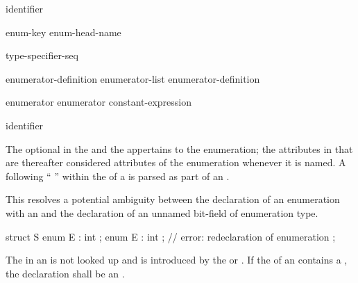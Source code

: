 \begin{bnf}
\br
     identifier
\end{bnf}

\begin{bnf}
\br
    enum-key  enum-head-name  \terminal{;}
\end{bnf}

\begin{bnf}
\br
    \br
     \br
     
\end{bnf}

\begin{bnf}
\br
    \terminal{:} type-specifier-seq
\end{bnf}

\begin{bnf}
\br
    enumerator-definition\br
    enumerator-list \terminal{,} enumerator-definition
\end{bnf}

\begin{bnf}
\br
    enumerator\br
    enumerator \terminal{=} constant-expression
\end{bnf}

\begin{bnf}
\br
    identifier 
\end{bnf}

The optional  in the  and
the  appertains to the enumeration; the attributes
in that  are thereafter considered attributes of the
enumeration whenever it is named.
A \tcode{:} following
``  ''
within the  of a 
is parsed as part of an .
\begin{note}
This resolves a potential ambiguity between the declaration of an enumeration
with an  and the declaration of an unnamed bit-field of enumeration
type.
\begin{example}
\begin{codeblock}
struct S {
  enum E : int {};
  enum E : int {};              // error: redeclaration of enumeration
};
\end{codeblock}
\end{example}
\end{note}
The  in an 
is not looked up and is introduced by
the  or .
If the  of an  contains
a ,
the declaration shall be an .

